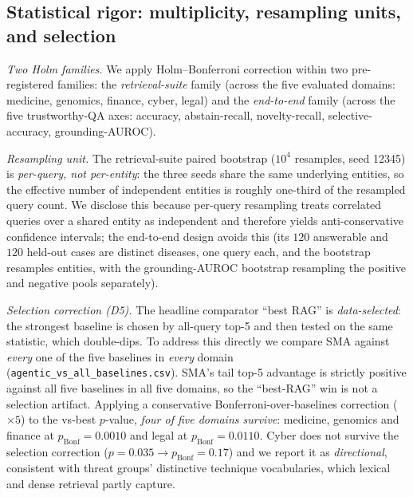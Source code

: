 \documentclass[pdflatex,sn-nature]{sn-jnl}
\begin{document}
\begin{appendices}
\subsection*{Statistical rigor: multiplicity, resampling units, and selection}

\textit{Two Holm families.} We apply Holm--Bonferroni correction within two
pre-registered families: the \emph{retrieval-suite} family (across the five
evaluated domains: medicine, genomics, finance, cyber, legal) and the
\emph{end-to-end} family (across the five trustworthy-QA axes: accuracy,
abstain-recall, novelty-recall, selective-accuracy, grounding-AUROC).

\textit{Resampling unit.} The retrieval-suite paired bootstrap ($10^4$
resamples, seed 12345) is \emph{per-query, not per-entity}: the three seeds
share the same underlying entities, so the effective number of independent
entities is roughly one-third of the resampled query count. We disclose this
because per-query resampling treats correlated queries over a shared entity as
independent and therefore yields anti-conservative confidence intervals; the
end-to-end design avoids this (its $120$ answerable and $120$ held-out cases are
distinct diseases, one query each, and the bootstrap resamples entities, with
the grounding-AUROC bootstrap resampling the positive and negative pools
separately).

\textit{Selection correction (D5).} The headline comparator ``best RAG'' is
\emph{data-selected}: the strongest baseline is chosen by all-query top-5 and
then tested on the same statistic, which double-dips. To address this directly
we compare SMA against \emph{every} one of the five baselines in \emph{every}
domain (\texttt{agentic\_vs\_all\_baselines.csv}). SMA's tail top-5 advantage is
strictly positive against all five baselines in all five domains, so the
``best-RAG'' win is not a selection artifact. Applying a conservative
Bonferroni-over-baselines correction ($\times 5$) to the vs-best $p$-value,
\emph{four of five domains survive}: medicine, genomics and finance at
$p_\text{Bonf}=0.0010$ and legal at $p_\text{Bonf}=0.0110$. Cyber does not
survive the selection correction ($p=0.035 \to p_\text{Bonf}=0.17$) and we
report it as \emph{directional}, consistent with threat groups' distinctive
technique vocabularies, which lexical and dense retrieval partly capture.


\end{appendices}
\end{document}
